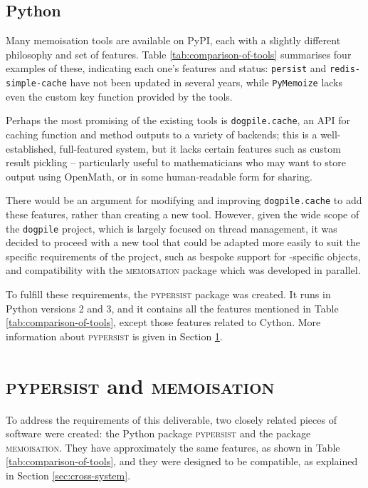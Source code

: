 \documentclass{deliverablereport}
\newcommand{\pypersist}{\textsc{pypersist}}
\newcommand{\Memoisation}{\textsc{memoisation}}
\begin{document}
\subsection{Python}
Many memoisation tools are available on PyPI, each with a slightly different
philosophy and set of features.  Table \ref{tab:comparison-of-tools} summarises
four examples of these, indicating each one's features and status:
\texttt{persist} and \texttt{redis-simple-cache} have not been updated in
several years, while \texttt{PyMemoize} lacks even the custom key function
provided by the \Sage tools.

Perhaps the most promising of the existing tools is \texttt{dogpile.cache}, an
API for caching function and method outputs to a variety of backends; this is a
well-established, full-featured system, but it lacks certain features such as
custom result pickling -- particularly useful to mathematicians who may want to
store output using OpenMath, or in some human-readable form for sharing.

There would be an argument for modifying and improving \texttt{dogpile.cache} to
add these features, rather than creating a new tool.  However, given the wide
scope of the \texttt{dogpile} project, which is largely focused on thread
management, it was decided to proceed with a new tool that could be adapted more
easily to suit the specific requirements of the project, such as bespoke support
for \Sage-specific objects, and compatibility with the \GAP \Memoisation{} package
which was developed in parallel.

To fulfill these requirements, the \pypersist{} package was created.  It runs in
Python versions 2 and 3, and it contains all the features mentioned in Table
\ref{tab:comparison-of-tools}, except those features related to Cython.  More
information about \pypersist{} is given in Section \ref{sec:pypersist}.

\section{\pypersist{} and \Memoisation{}}
\label{sec:pypersist}

To address the requirements of this deliverable, two closely related pieces of
software were created: the Python package \pypersist{} and the \GAP package
\Memoisation{}.  They have approximately the same features, as shown in Table
\ref{tab:comparison-of-tools}, and they were designed to be compatible, as
explained in Section \ref{sec:cross-system}.
\end{document}
